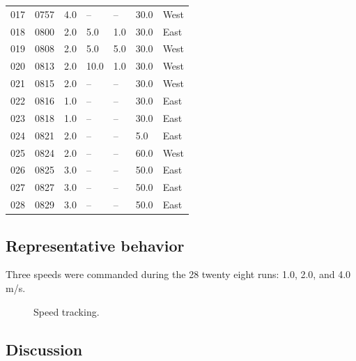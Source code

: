 \begin{center}
\begin{longtable}{lllllll}
  017 & 0757 & 4.0 & -- & -- & 30.0 & West \\
  018 & 0800 & 2.0 & 5.0 & 1.0 & 30.0 & East \\
  019 & 0808 & 2.0 & 5.0 & 5.0 & 30.0 & West \\
  020 & 0813 & 2.0 & 10.0 & 1.0 & 30.0 & West \\
  021 & 0815 & 2.0 & -- & -- & 30.0 & West \\
  022 & 0816 & 1.0 & -- & -- & 30.0 & East \\
  023 & 0818 & 1.0 & -- & -- & 30.0 & East \\
  024 & 0821 & 2.0 & -- & -- & 5.0 & East \\
  025 & 0824 & 2.0 & -- & -- & 60.0 & West \\
  026 & 0825 & 3.0 & -- & -- & 50.0 & East \\
  027 & 0827 & 3.0 & -- & -- & 50.0 & East \\
  028 & 0829 & 3.0 & -- & -- & 50.0 & East \\
  \bottomrule
  \end{longtable}
\end{center}

\subsection{Representative behavior} \label{rb:subsec:representative}
Three speeds were commanded during the 28 twenty eight runs: 1.0, 2.0, and 4.0
m/s.
\begin{figure}[htbp]
  \centering
  \caption{Speed tracking.}
  \label{rb:fig:velocity_tracking}
\end{figure}

\subsection{Discussion} \label{rb:subsec:discuss}




